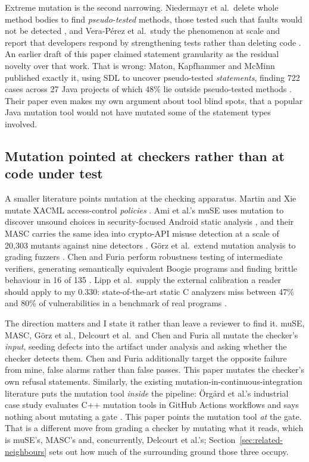 \documentclass[11pt]{article}
\begin{document}
Extreme mutation is the second narrowing. Niedermayr et al.\ delete whole method bodies to
find \emph{pseudo-tested} methods, those tested such that faults would not be detected
\citep{niedermayr2016extreme}, and Vera-P\'erez et al.\ study the phenomenon at scale and
report that developers respond by strengthening tests rather than deleting code
\citep{veraperez2019pseudo}. An earlier draft of this paper claimed statement granularity as
the residual novelty over that work. That is wrong: Maton, Kapfhammer and McMinn published
exactly it, using SDL to uncover pseudo-tested \emph{statements}, finding 722 cases across
27 Java projects of which 48\% lie outside pseudo-tested methods
\citep{maton2024pseudotested}. Their paper even makes my own argument about tool blind spots,
that a popular Java mutation tool would not have mutated some of the statement types
involved.

\subsection{Mutation pointed at checkers rather than at code under test}

A smaller literature points mutation at the checking apparatus. Martin and Xie mutate
XACML access-control \emph{policies} \citep{martin2007acpolicy}. Ami et al.'s muSE uses
mutation to discover unsound choices in security-focused Android static analysis
\citep{ami2021muse}, and their MASC carries the same idea into crypto-API misuse detection
at a scale of 20,303 mutants against nine detectors \citep{ami2022masc,ami2023masc}.
G\"orz et al.\ extend mutation analysis to grading fuzzers
\citep{gorz2023fuzzers}. Chen and Furia perform robustness testing of intermediate
verifiers, generating semantically equivalent Boogie programs and finding brittle behaviour
in 16 of 135 \citep{chen2018robustness}. Lipp et al.\ supply the external calibration a
reader should apply to my 0.330: state-of-the-art static C analyzers miss between 47\% and
80\% of vulnerabilities in a benchmark of real programs \citep{lipp2022static}.

The direction matters and I state it rather than leave a reviewer to find it. muSE, MASC,
G\"orz et al., Delcourt et al.\ and Chen and Furia all mutate the checker's \emph{input},
seeding defects into the artifact under analysis and asking whether the checker detects
them. Chen and Furia
additionally target the opposite failure from mine, false alarms rather than false passes.
This paper mutates the checker's own refusal statements. Similarly, the existing
mutation-in-continuous-integration literature puts the mutation tool \emph{inside} the
pipeline: \"Org\aa rd et al.'s industrial case study evaluates C++ mutation tools in GitHub
Actions workflows and says nothing about mutating a gate \citep{orgard2023mutationci}. This
paper points the mutation tool \emph{at} the gate. That is a different move from grading a
checker by mutating what it reads, which is muSE's, MASC's and, concurrently, Delcourt et
al.'s; Section~\ref{sec:related-neighbours} sets out how much of the surrounding ground
those three occupy.
\end{document}
